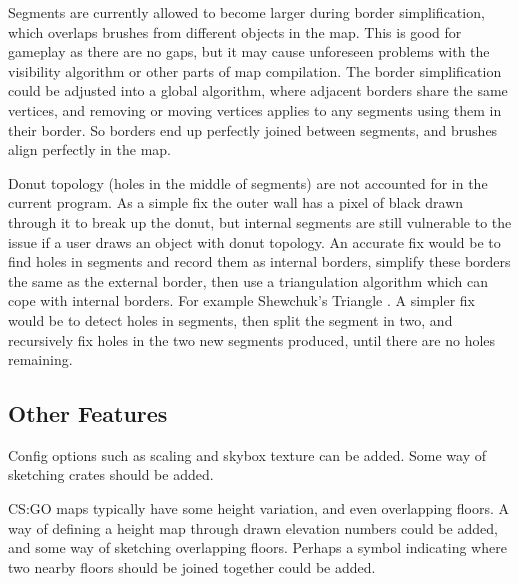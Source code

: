 \documentclass[conference]{IEEEtran}
\begin{document}
Segments are currently allowed to become larger during border simplification, which overlaps brushes from different objects in the map. This is good for gameplay as there are no gaps, but it may cause unforeseen problems with the visibility algorithm or other parts of map compilation. The border simplification could be adjusted into a global algorithm, where adjacent borders share the same vertices, and removing or moving vertices applies to any segments using them in their border. So borders end up perfectly joined between segments, and brushes align perfectly in the map.

Donut topology (holes in the middle of segments) are not accounted for in the current program. As a simple fix the outer wall has a pixel of black drawn through it to break up the donut, but internal segments are still vulnerable to the issue if a user draws an object with donut topology. An accurate fix would be to find holes in segments and record them as internal borders, simplify these borders the same as the external border, then use a triangulation algorithm which can cope with internal borders. For example Shewchuk's Triangle \cite{shewchuk2005two}. A simpler fix would be to detect holes in segments, then split the segment in two, and recursively fix holes in the two new segments produced, until there are no holes remaining.

\subsection{Other Features}

Config options such as scaling and skybox texture can be added. Some way of sketching crates should be added.

CS:GO maps typically have some height variation, and even overlapping floors. A way of defining a height map through drawn elevation numbers could be added, and some way of sketching overlapping floors. Perhaps a symbol indicating where two nearby floors should be joined together could be added.



\end{document}
